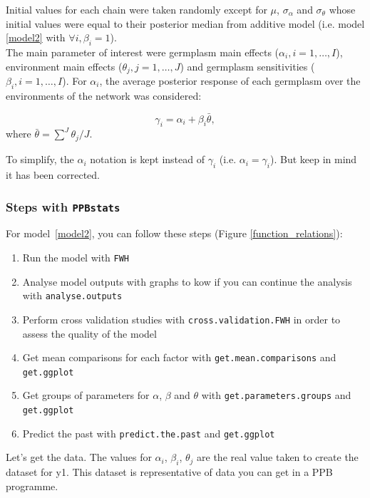 \documentclass{article}\usepackage[]{graphicx}\usepackage[]{color}
\newcommand{\pack}{\texttt{PPBstats}}
\begin{document}
Initial values for each chain were taken randomly except for $\mu$, $\sigma_{\alpha}$ and $\sigma_{\theta}$ whose initial values were equal to their posterior median from additive model (i.e. model \ref{model2} with $\forall i, \beta_{i}=1$). \\


The main parameter of interest were 
germplasm main effects ($\alpha_{i}, i = 1,\ldots, I$), 
environment main effects ($\theta_{j}, j = 1,\ldots, J$) and 
germplasm sensitivities ($\beta_{i}, i = 1,\ldots, I$).
For $\alpha_i$, the average posterior response of each germplasm over the environments of the network was considered:

\begin{displaymath}
\gamma_i = \alpha_i + \beta_{i} \bar{\theta},
\end{displaymath}
where
$\bar{\theta} = \sum_{}^{J} \theta_j/J$.

To simplify, the $\alpha_i$ notation is kept instead of $\gamma_i$ (i.e. $\alpha_i = \gamma_i$).
But keep in mind it has been corrected.

\subsubsection{Steps with \pack}

For model~\ref{model2}, you can follow these steps (Figure \ref{function_relations}):

\begin{enumerate}
\item Run the model with \texttt{FWH}
\item Analyse model outputs with graphs to kow if you can continue the analysis with \texttt{analyse.outputs}
\item Perform cross validation studies with \texttt{cross.validation.FWH} in order to assess the quality of the model
\item Get mean comparisons for each factor with \texttt{get.mean.comparisons} and \texttt{get.ggplot}
\item Get groups of parameters for $\alpha$, $\beta$ and $\theta$ with \texttt{get.parameters.groups} and \texttt{get.ggplot}
\item Predict the past with \texttt{predict.the.past} and \texttt{get.ggplot}
\end{enumerate}

Let's get the data.
The values for $\alpha_i$, $\beta_i$, $\theta_j$ are the real value taken to create the dataset for y1.
This dataset is representative of data you can get in a PPB programme.
\end{document}
